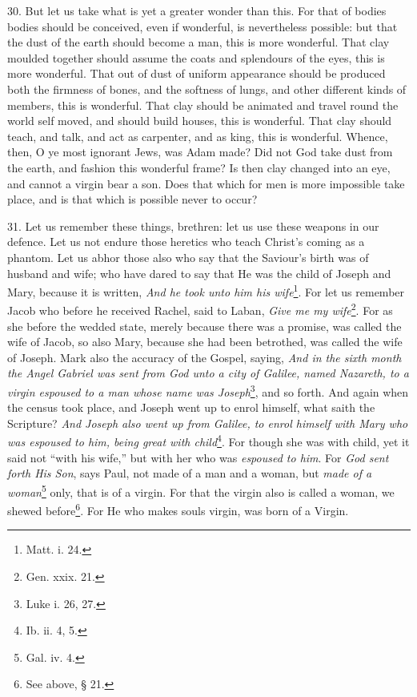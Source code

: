 30. But let us take what is yet a greater wonder than this. For that of bodies bodies should be conceived, even if wonderful, is nevertheless possible: but that the dust of the earth should become a man, this is more wonderful. That clay moulded together should assume the coats and splendours of the eyes, this is more wonderful. That out of dust of uniform appearance should be produced both the firmness of bones, and the softness of lungs, and other different kinds of members, this is wonderful. That clay should be animated and travel round the world self moved, and should build houses, this is wonderful. That clay should teach, and talk, and act as carpenter, and as king, this is wonderful. Whence, then, O ye most ignorant Jews, was Adam made? Did not God take dust from the earth, and fashion this wonderful frame? Is then clay changed into an eye, and cannot a virgin bear a son. Does that which for men is more impossible take place, and is that which is possible never to occur?

31. Let us remember these things, brethren: let us use these weapons in our defence. Let us not endure those heretics who teach Christ’s coming as a phantom. Let us abhor those also who say that the Saviour’s birth was of husband and wife; who have dared to say that He was the child of Joseph and Mary, because it is written, \emph{And he took unto him his wife}\footnote{Matt. i. 24.}. For let us remember Jacob who before he received Rachel, said to Laban, \emph{Give me my wife}\footnote{Gen. xxix. 21.}. For as she before the wedded state, merely because there was a promise, was called the wife of Jacob, so also Mary, because she had been betrothed, was called the wife of Joseph. Mark also the accuracy of the Gospel, saying, \emph{And in the sixth month the Angel Gabriel was sent from God unto a city of Galilee, named Nazareth, to a virgin espoused to a man whose name was Joseph}\footnote{Luke i. 26, 27.}, and so forth. And again when the census took place, and Joseph went up to enrol himself, what saith the Scripture? \emph{And Joseph also went up from Galilee, to enrol himself with Mary who was espoused to him, being great with child}\footnote{Ib. ii. 4, 5.}. For though she was with child, yet it said not “with his wife,” but with her who was \emph{espoused to him}. For \emph{God sent forth His Son}, says Paul, not made of a man and a woman, but \emph{made of a woman}\footnote{Gal. iv. 4.} only, that is of a virgin. For that the virgin also is called a woman, we shewed before\footnote{See above, § 21.}. For He who makes souls virgin, was born of a Virgin.

